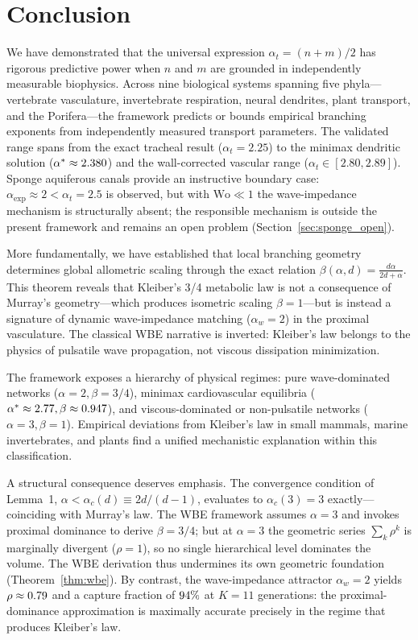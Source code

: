 \documentclass[11pt,a4paper]{article}
\theoremstyle{remark}
\begin{document}
\section{Conclusion}

We have demonstrated that the universal expression $\alpha_t = (n+m)/2$ has
rigorous predictive power when $n$ and $m$ are grounded in independently
measurable biophysics. Across nine biological systems spanning five
phyla---vertebrate vasculature, invertebrate respiration, neural dendrites,
plant transport, and the Porifera---the framework predicts or bounds empirical
branching exponents from independently measured transport parameters. The
validated range spans from the exact tracheal result ($\alpha_t = 2.25$) to the
minimax dendritic solution ($\alpha^* \approx 2.380{}$) and the wall-corrected
vascular range ($\alpha_t \in [2.80, 2.89]$). Sponge aquiferous canals provide an instructive boundary case: $\alpha_{\exp}
\approx 2 < \alpha_t = 2.5$ is observed, but with $\mathrm{Wo} \ll 1$ the
wave-impedance mechanism is structurally absent; the responsible mechanism is
outside the present framework and remains an open problem
(Section~\ref{sec:sponge_open}).

More fundamentally, we have established that local branching geometry determines
global allometric scaling through the exact relation $\beta(\alpha, d) =
\frac{d\alpha}{2d + \alpha}$. This theorem reveals that Kleiber's 3/4 metabolic
law is not a consequence of Murray's geometry---which produces isometric scaling
$\beta = 1$---but is instead a signature of dynamic wave-impedance matching
($\alpha_w = 2$) in the proximal vasculature. The classical WBE narrative is
inverted: Kleiber's law belongs to the physics of pulsatile wave propagation,
not viscous dissipation minimization.

The framework exposes a hierarchy of physical regimes: pure wave-dominated
networks ($\alpha = 2, \beta = 3/4$), minimax cardiovascular equilibria
($\alpha^* \approx 2.77{}, \beta \approx 0.947{}$), and
viscous-dominated or non-pulsatile networks ($\alpha = 3, \beta = 1$). Empirical
deviations from Kleiber's law in small mammals, marine invertebrates, and plants
find a unified mechanistic explanation within this classification.

A structural consequence deserves emphasis. The convergence condition of
Lemma~1, $\alpha < \alpha_c(d) \equiv 2d/(d-1)$, evaluates to $\alpha_c(3) = 3$
exactly---coinciding with Murray's law. The WBE framework assumes $\alpha = 3$
and invokes proximal dominance to derive $\beta = 3/4$; but at $\alpha = 3$ the
geometric series $\sum_k \rho^k$ is marginally divergent ($\rho = 1$), so no
single hierarchical level dominates the volume. The WBE derivation thus
undermines its own geometric foundation (Theorem~\ref{thm:wbe}). By contrast, the
wave-impedance attractor $\alpha_w = 2$ yields $\rho \approx 0.79{}$
and a capture fraction of $94{}\%$ at $K=11$ generations: the
proximal-dominance approximation is maximally accurate precisely in the regime
that produces Kleiber's law.
\end{document}
